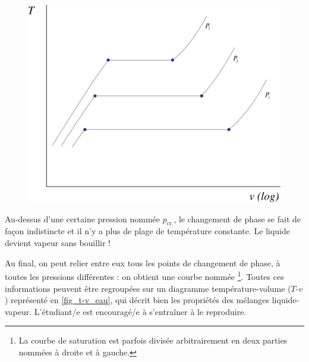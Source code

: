 		\begin{figure}
			\begin{center}
				\includegraphics[width=\didacticpvdiagramwidth]{images/tv_liquidevapeur_construction.png}
			\end{center}
			\label{fig_T-v_construction_2}
		\end{figure}

		Au-dessus d’une certaine pression nommée  $p_\text{cr.}$, le changement de phase se fait de façon indistincte et il n’y a plus de plage de température constante. Le liquide devient vapeur sans bouillir !

		Au final, on peut relier entre eux tous les points de changement de phase, à toutes les pressions différentes : on obtient une courbe nommée \footnote{La courbe de saturation est parfois divisée arbitrairement en deux parties nommées  à droite et  à gauche.}. Toutes ces informations peuvent être regroupées sur un diagramme température-volume ($T$-$v$) représenté en \cref{fig_t-v_eau}, qui décrit bien les propriétés des mélanges liquide-vapeur. L’étudiant/e est encouragé/e à s’entraîner à le reproduire.

